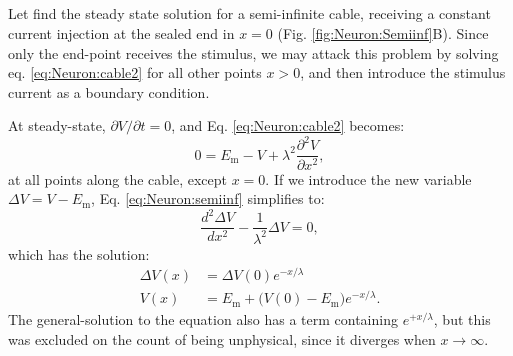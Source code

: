 \subsection{}
\label{sec:Neuron:cableSS}
Let find the steady state solution for a semi-infinite cable, receiving a constant current injection at the sealed end in $x=0$ (Fig. \ref{fig:Neuron:Semiinf}B). Since only the end-point receives the stimulus, we may attack this problem by solving eq. \ref{eq:Neuron:cable2} for all other points $x>0$, and then introduce the stimulus current as a boundary condition. 

At steady-state, $\partial V/\partial t = 0$, and Eq. \ref{eq:Neuron:cable2} becomes:
\begin{equation}
0 = E_\text{m}-V +  \lambda^2 \frac{\partial^2 V}{\partial x^2}, 
\label{eq:Neuron:semiinf}
\end{equation}
at all points along the cable, except $x=0$. If we introduce the new variable $\Delta{V}=V-E_\text{m}$, Eq. \ref{eq:Neuron:semiinf} simplifies to:
\begin{equation}
\frac{d^2 \Delta{V}}{d x^2} -  \frac{1}{\lambda^2} \Delta{V}=0, 
\label{eq:Neuron:semiinf2}
\end{equation}
which has the solution:
\begin{align}
\Delta{V}(x) &= \Delta{V}(0) e^{-x/\lambda} \\
V(x) &= E_\text{m} + \big( V(0)-E_\text{m} \big) e^{-x/\lambda}.
\label{eq:Neuron:semiinf3}
\end{align}
The general-solution to the equation also has a term containing $e^{+x/\lambda}$, but this was excluded on the count of being unphysical, since it diverges when $x \rightarrow \infty$. 


